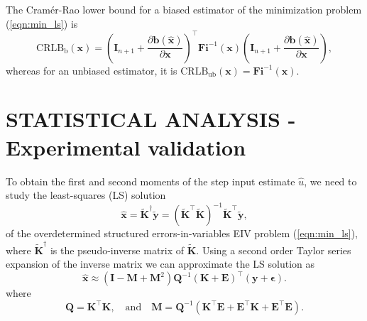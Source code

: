 The Cram\'er-Rao lower bound for a biased estimator of the minimization problem (\ref{eqn:min_ls}) is 
\begin{equation} \mathrm{CRLB}_{\mathrm{b}}(\mathbf{x}) = \left( \mathbf{I}_{n+1} + \frac{\partial \mathbf{b} \left( \widehat{\mathbf{x}} \right) }{\partial \mathbf{x} } \right)^\top \mathbf{Fi}^{-1}(\mathbf{x}) \left( \mathbf{I}_{n+1} + \frac{\partial \mathbf{b} \left( \widehat{\mathbf{x}} \right) }{\partial \mathbf{x} } \right), \label{eqn:CRB_EIV} \end{equation} 
whereas for an unbiased estimator, it is $\mathrm{CRLB}_{\mathrm{ub}}(\mathbf{x}) = \mathbf{Fi}^{-1}(\mathbf{x})$.





\section{STATISTICAL ANALYSIS - Experimental validation}

To obtain the first and second moments of the step input estimate $\widehat{u}$, we need to study the least-squares (LS) solution 
\begin{equation} \widehat{\mathbf{x}} = \widetilde{\mathbf{K}}^\dagger \widetilde{\mathbf{y}} = ( \widetilde{\mathbf{K}}^\top \widetilde{\mathbf{K}}  )^{-1} \widetilde{\mathbf{K}}^\top \widetilde{\mathbf{y}} , \label{eqn:xhat} \end{equation}
of the overdetermined structured errors-in-variables EIV problem (\ref{eqn:min_ls}), 
where $\widetilde{\mathbf{K}}^\dagger$ is the pseudo-inverse matrix of $\widetilde{\mathbf{K}}$.
Using a second order Taylor series expansion of the inverse matrix we can approximate the LS solution as
\begin{equation} \widehat{\mathbf{x}} \approx \left( \mathbf{I} - \mathbf{M} + \mathbf{M}^2 \right) \mathbf{Q}^{-1} (\mathbf{K}+\mathbf{E})^\top (\mathbf{y}+\bm{\epsilon}). \label{eqn:xhatexp} \end{equation} 
where 
\begin{equation} \mathbf{Q} = \mathbf{K}^\top \mathbf{K}, \quad \text{and} \quad \mathbf{M} = \mathbf{Q}^{-1} ( \mathbf{K}^\top \mathbf{E} + \mathbf{E}^\top \mathbf{K} + \mathbf{E}^\top \mathbf{E} ). \end{equation} 

